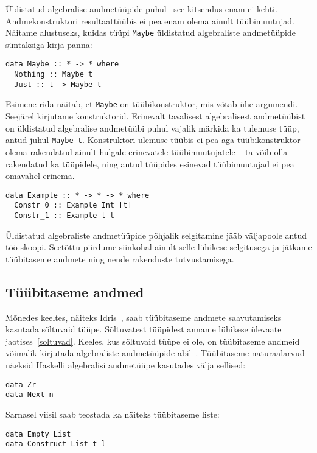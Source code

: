 \documentclass[12pt]{article}
\begin{document}
      Üldistatud algebralise andmetüüpide puhul~\cite{Fir} see kitsendus enam ei kehti. Andmekonstruktori resultaattüübis ei pea enam olema ainult tüübimuutujad. Näitame alustuseks, kuidas tüüpi \verb!Maybe! üldistatud algebraliste andmetüüpide süntaksiga kirja panna:

      \begin{verbatim}data Maybe :: * -> * where
  Nothing :: Maybe t
  Just :: t -> Maybe t\end{verbatim}

      Esimene rida näitab, et \verb!Maybe! on tüübikonstruktor, mis võtab ühe argumendi. Seejärel kirjutame konstruktorid. Erinevalt tavalisest algebralisest andmetüübist on üldistatud algebralise andmetüübi puhul vajalik märkida ka tulemuse tüüp, antud juhul \verb!Maybe t!. Konstruktori ulemuse tüübis ei pea aga tüübikonstruktor olema rakendatud ainult hulgale erinevatele tüübimuutujatele -- ta võib olla rakendatud ka tüüpidele, ning antud tüüpides esinevad tüübimuutujad ei pea omavahel erinema.

      \begin{verbatim}data Example :: * -> * -> * where
  Constr_0 :: Example Int [t]
  Constr_1 :: Example t t\end{verbatim}

      Üldistatud algebraliste andmetüüpide põhjalik selgitamine jääb väljapoole antud töö skoopi. Seetõttu piirdume siinkohal ainult selle lühikese selgitusega ja jätkame tüübitaseme andmete ning nende rakenduste tutvustamisega.
    \subsection{Tüübitaseme andmed}\label{tyybitasemeandmed}
      Mõnedes keeltes, näiteks Idris~\cite{The_Idr}, saab tüübitaseme andmete saavutamiseks kasutada sõltuvaid tüüpe. Sõltuvatest tüüpidest anname lühikese ülevaate jaotises~\ref{soltuvad}. Keeles, kus sõltuvaid tüüpe ei ole, on tüübitaseme andmeid võimalik kirjutada algebraliste andmetüüpide abil~\cite{Giv}. Tüübitaseme naturaalarvud näeksid Haskelli algebralisi andmetüüpe kasutades välja sellised:

      \begin{verbatim}data Zr
data Next n\end{verbatim}

      Sarnasel viisil saab teostada ka näiteks tüübitaseme liste:

      \begin{verbatim}data Empty_List
data Construct_List t l\end{verbatim}
\end{document}
